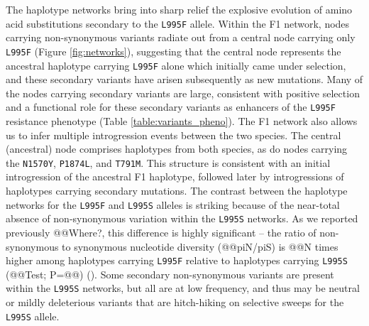 \documentclass[a4paper,11pt,abstracton,hidelinks]{scrartcl}
\begin{document}
%
The haplotype networks bring into sharp relief the explosive evolution of amino acid substitutions secondary to the \texttt{L995F} allele.
%
Within the F1 network, nodes carrying non-synonymous variants radiate out from a central node carrying only \texttt{L995F} (Figure \ref{fig:networks}), suggesting that the central node represents the ancestral haplotype carrying \texttt{L995F} alone which initially came under selection, and these secondary variants have arisen subsequently as new mutations.
%
Many of the nodes carrying secondary variants are large, consistent with positive selection and a functional role for these secondary variants as enhancers of the \texttt{L995F} resistance phenotype (Table \ref{table:variants_pheno}).
%
The F1 network also allows us to infer multiple introgression events between the two species.
%
The central (ancestral) node comprises haplotypes from both species, as do nodes carrying the \texttt{N1570Y}, \texttt{P1874L}, and \texttt{T791M}.
%
This structure is consistent with an initial introgression of the ancestral F1 haplotype, followed later by introgressions of haplotypes carrying secondary mutations.
%
The contrast between the haplotype networks for the \texttt{L995F} and \texttt{L995S} alleles is striking because of the near-total absence of non-synonymous variation within the \texttt{L995S} networks.
%
As we reported previously @@Where?, this difference is highly significant -- the ratio of non-synonymous to synonymous nucleotide diversity (@@piN/piS) is @@N times higher among haplotypes carrying \texttt{L995F} relative to haplotypes carrying \texttt{L995S} (@@Test; P=@@) (\cite{Ag1000gConsortium2017}).
%
Some secondary non-synonymous variants are present within the \texttt{L995S} networks, but all are at low frequency, and thus may be neutral or mildly deleterious variants that are hitch-hiking on selective sweeps for the \texttt{L995S} allele.
\end{document}
